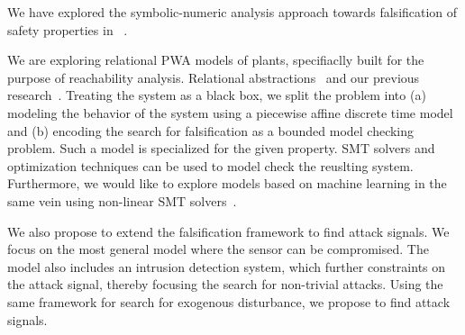 We have explored the symbolic-numeric analysis approach towards
falsification of safety properties in ~\cite{}.



We are exploring relational PWA models of plants, specifiaclly built
for the purpose of reachability analysis.  Relational
abstractions~\cite{Tiwari2012} and our previous
research~\cite{zutshi2012timed}. Treating the system as a black box,
we split the problem into (a) modeling the behavior of the system
using a piecewise affine discrete time model and (b) encoding the
search for falsification as a bounded model checking problem. Such a
model is specialized for the given property.  SMT solvers and
optimization techniques can be used to model check the reuslting
system.  Furthermore, we would like to explore models based on machine
learning in the same vein using non-linear SMT
solvers~\cite{gao2013dreal}.






We also propose to extend the falsification framework to find attack
signals. We focus on the most general model where the sensor
can be compromised. The model also includes an intrusion detection
system, which further constraints on the attack signal, thereby
focusing the search for non-trivial attacks.
Using the same framework for search for exogenous disturbance, we
propose to find attack signals.










